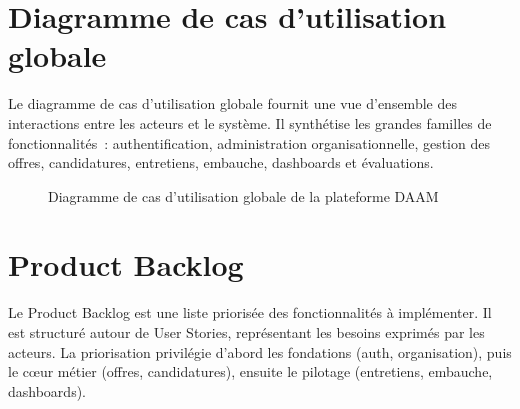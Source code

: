 \section{Diagramme de cas d'utilisation globale}

Le diagramme de cas d'utilisation globale fournit une vue d'ensemble des
interactions entre les acteurs et le système. Il synthétise les grandes
familles de fonctionnalités~: authentification, administration organisationnelle,
gestion des offres, candidatures, entretiens, embauche, dashboards et
évaluations.

\clearpage
\begin{figure}[p]
  \centering
  \caption{Diagramme de cas d'utilisation globale de la plateforme DAAM}
  \label{fig:uc-global}
\end{figure}
\clearpage


\section{Product Backlog}

Le Product Backlog est une liste priorisée des fonctionnalités à implémenter.
Il est structuré autour de User Stories, représentant les besoins exprimés par
les acteurs. La priorisation privilégie d'abord les fondations (auth, organisation),
puis le cœur métier (offres, candidatures), ensuite le pilotage (entretiens,
embauche, dashboards).

